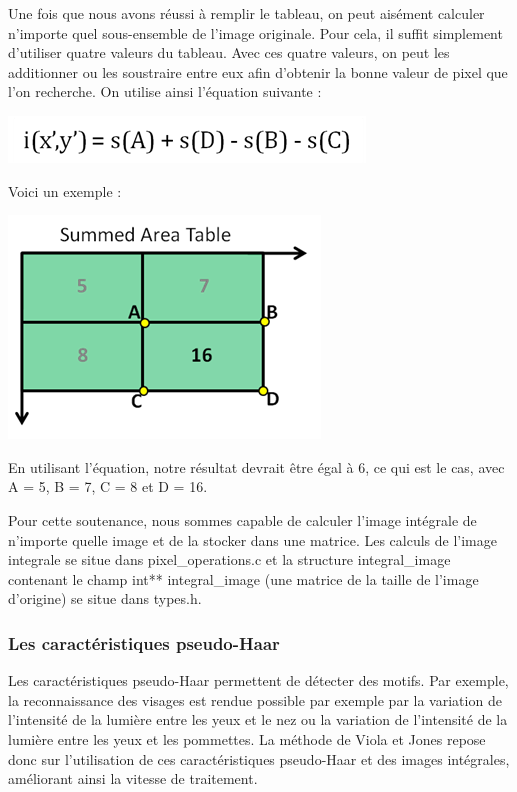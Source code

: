\documentclass[12pt,a4paper]{article}
\begin{document}
Une fois que nous avons réussi à remplir le tableau, on peut aisément calculer n'importe quel sous-ensemble de l'image originale. Pour cela, il suffit simplement  d'utiliser quatre valeurs du tableau. Avec ces quatre valeurs, on peut les additionner ou les soustraire entre eux afin d'obtenir la bonne valeur de pixel que l'on recherche. On utilise ainsi l'équation suivante :

\begin{center}
\includegraphics[scale=.7]{Pictures/integrale4.png}
\end{center}

Voici un exemple :
 
\begin{center}
\includegraphics[scale=.7]{Pictures/integrale5.png}
\end{center}

En utilisant l'équation, notre résultat devrait être égal à 6, ce qui est le cas, avec A = 5, B = 7, C = 8 et D = 16.

Pour cette soutenance, nous sommes capable de calculer l'image intégrale de n'importe quelle image et de la stocker dans une matrice. Les calculs de l'image integrale se situe dans pixel\_operations.c et la structure integral\_image contenant le champ int** integral\_image (une matrice de la taille de l'image d'origine) se situe dans types.h.

 \newpage
\subsubsection{Les caractéristiques pseudo-Haar}
Les caractéristiques pseudo-Haar permettent de détecter des motifs. Par exemple, la reconnaissance des visages est rendue possible par exemple par la variation de l'intensité de la lumière entre les yeux et le nez ou la variation de l'intensité de la lumière entre les yeux et les pommettes. 
La méthode de Viola et Jones repose donc sur l'utilisation de ces caractéristiques pseudo-Haar et des images intégrales, améliorant ainsi la vitesse de traitement.
\end{document}
